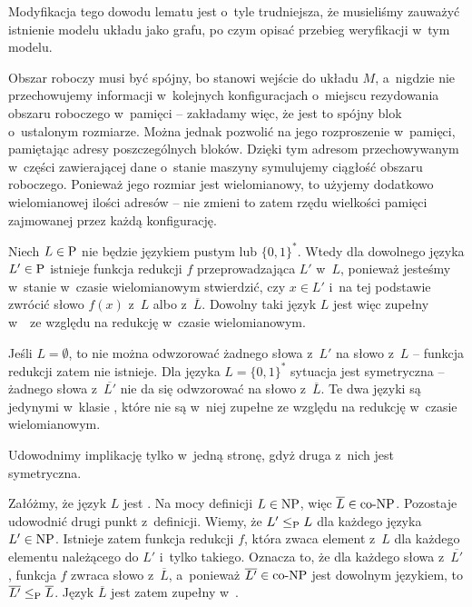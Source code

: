Modyfikacja tego dowodu lematu jest o~tyle trudniejsza, że musieliśmy zauważyć istnienie modelu układu jako grafu, po czym opisać przebieg weryfikacji w~tym modelu.

\exercise %
Obszar roboczy musi być spójny, bo stanowi wejście do układu $M$, a~nigdzie nie przechowujemy informacji w~kolejnych konfiguracjach o~miejscu rezydowania obszaru roboczego w~pamięci -- zakładamy więc, że jest to spójny blok o~ustalonym rozmiarze.
Można jednak pozwolić na jego rozproszenie w~pamięci, pamiętając adresy poszczególnych bloków.
Dzięki tym adresom przechowywanym w~części zawierającej dane o~stanie maszyny symulujemy ciągłość obszaru roboczego.
Ponieważ jego rozmiar jest wielomianowy, to użyjemy dodatkowo wielomianowej ilości adresów -- nie zmieni to zatem rzędu wielkości pamięci zajmowanej przez każdą konfigurację.

\exercise %
Niech $L\in\text{P}$ nie będzie językiem pustym lub $\{0,1\}^*$.
Wtedy dla dowolnego języka $L'\in\text{P}$ istnieje funkcja redukcji $f$ przeprowadzająca $L'$ w~$L$, ponieważ jesteśmy w~stanie w~czasie wielomianowym stwierdzić, czy $x\in L'$ i~na tej podstawie zwrócić słowo $f(x)$ z~$L$ albo z~$\overline{L}$.
Dowolny taki język $L$ jest więc zupełny w~\Pclass\ ze względu na redukcję w~czasie wielomianowym.

Jeśli $L=\emptyset$, to nie można odwzorować żadnego słowa z~$L'$ na słowo z~$L$ -- funkcja redukcji zatem nie istnieje.
Dla języka $L=\{0,1\}^*$ sytuacja jest symetryczna -- żadnego słowa z~$\overline{L'}$ nie da się odwzorować na słowo z~$\overline{L}$.
Te dwa języki są jedynymi w~klasie \Pclass, które nie są w~niej zupełne ze względu na redukcję w~czasie wielomianowym.

\exercise %
Udowodnimy implikację tylko w~jedną stronę, gdyż druga z~nich jest symetryczna.

Załóżmy, że język $L$ jest .
Na mocy definicji  $L\in\text{NP}$, więc $\overline{L}\in\text{co-NP}$.
Pozostaje udowodnić drugi punkt z~definicji.
Wiemy, że $L'\le_{\text{P}} L$ dla każdego języka $L'\in\text{NP}$.
Istnieje zatem funkcja redukcji $f$, która zwaca element z~$L$ dla każdego elementu należącego do $L'$ i~tylko takiego.
Oznacza to, że dla każdego słowa z~$\overline{L'}$, funkcja $f$ zwraca słowo z~$\overline{L}$, a~ponieważ $\overline{L'}\in\text{co-NP}$ jest dowolnym językiem, to $\overline{L'}\le_{\text{P}}\overline{L}$.
Język $\overline{L}$ jest zatem zupełny w~\coNPclass.

